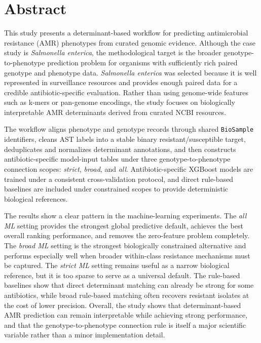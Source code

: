 \chapter*{Abstract}
{}

This study presents a determinant-based workflow for predicting antimicrobial resistance (AMR) phenotypes from curated genomic evidence. Although the case study is \textit{Salmonella enterica}, the methodological target is the broader genotype-to-phenotype prediction problem for organisms with sufficiently rich paired genotype and phenotype data. \textit{Salmonella enterica} was selected because it is well represented in surveillance resources and provides enough paired data for a credible antibiotic-specific evaluation. Rather than using genome-wide features such as k-mers or pan-genome encodings, the study focuses on biologically interpretable AMR determinants derived from curated NCBI resources.

The workflow aligns phenotype and genotype records through shared \texttt{BioSample} identifiers, cleans AST labels into a stable binary resistant/susceptible target, deduplicates and normalizes determinant annotations, and then constructs antibiotic-specific model-input tables under three genotype-to-phenotype connection scopes: \textit{strict}, \textit{broad}, and \textit{all}. Antibiotic-specific XGBoost models are trained under a consistent cross-validation protocol, and direct rule-based baselines are included under constrained scopes to provide deterministic biological references.

The results show a clear pattern in the machine-learning experiments. The \textit{all ML} setting provides the strongest global predictive default, achieves the best overall ranking performance, and removes the zero-feature problem completely. The \textit{broad ML} setting is the strongest biologically constrained alternative and performs especially well when broader within-class resistance mechanisms must be captured. The \textit{strict ML} setting remains useful as a narrow biological reference, but it is too sparse to serve as a universal default. The rule-based baselines show that direct determinant matching can already be strong for some antibiotics, while broad rule-based matching often recovers resistant isolates at the cost of lower precision. Overall, the study shows that determinant-based AMR prediction can remain interpretable while achieving strong performance, and that the genotype-to-phenotype connection rule is itself a major scientific variable rather than a minor implementation detail.
